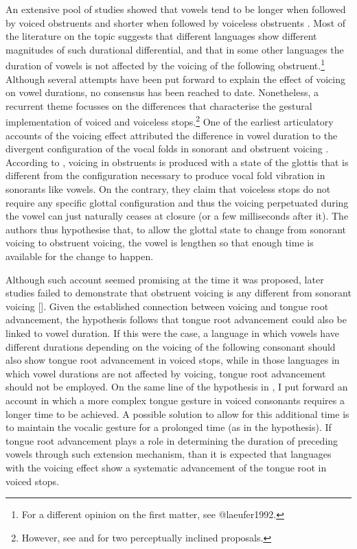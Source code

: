 \documentclass[authoryear, twocolumn]{elsarticle}
\begin{document}
An extensive pool of studies showed that vowels tend to be longer when
followed by voiced obstruents and shorter when followed by voiceless
obstruents \citep{house1953, chen1970, klatt1973, lisker1973}. Most of
the literature on the topic suggests that different languages show
different magnitudes of such durational differential, and that in some
other languages the duration of vowels is not affected by the voicing of
the following
obstruent.\footnote{For a different opinion on the first matter, see @laeufer1992.}
Although several attempts have been put forward to explain the effect of
voicing on vowel durations, no consensus has been reached to date.
Nonetheless, a recurrent theme focusses on the differences that
characterise the gestural implementation of voiced and voiceless
stops.\footnote{However, see \citep{javkin1976} and \cite{kluender1988} for two perceptually inclined proposals.}
One of the earliest articulatory accounts of the voicing effect
attributed the difference in vowel duration to the divergent
configuration of the vocal folds in sonorant and obstruent voicing
\citetext{\citealp{halle1967}; \citealp[reiterated in][]{chomsky1968}}.
According to \citet{halle1967}, voicing in obstruents is produced with a
state of the glottis that is different from the configuration necessary
to produce vocal fold vibration in sonorants like vowels. On the
contrary, they claim that voiceless stops do not require any specific
glottal configuration and thus the voicing perpetuated during the vowel
can just naturally ceases at closure (or a few milliseconds after it).
The authors thus hypothesise that, to allow the glottal state to change
from sonorant voicing to obstruent voicing, the vowel is lengthen so
that enough time is available for the change to happen.

Although such account seemed promising at the time it was proposed,
later studies failed to demonstrate that obstruent voicing is any
different from sonorant voicing {[}{]}. Given the established connection
between voicing and tongue root advancement, the hypothesis follows that
tongue root advancement could also be linked to vowel duration. If this
were the case, a language in which vowels have different durations
depending on the voicing of the following consonant should also show
tongue root advancement in voiced stops, while in those languages in
which vowel durations are not affected by voicing, tongue root
advancement should not be employed. On the same line of the hypothesis
in \citet{halle1967}, I put forward an account in which a more complex
tongue gesture in voiced consonants requires a longer time to be
achieved. A possible solution to allow for this additional time is to
maintain the vocalic gesture for a prolonged time (as in the
\citet{halle1967} hypothesis). If tongue root advancement plays a role
in determining the duration of preceding vowels through such extension
mechanism, than it is expected that languages with the voicing effect
show a systematic advancement of the tongue root in voiced stops.
\end{document}
